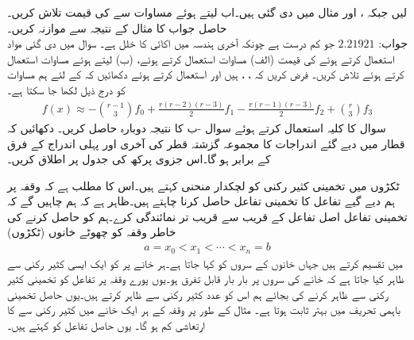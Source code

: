 \quad
{} لیں جبکہ ،  اور  مثال  میں دی گئی ہیں۔اب  لیتے ہوئے مساوات  سے  کی قیمت تلاش کریں۔حاصل جواب کا مثال  کے نتیجہ سے موازنہ کریں۔\\
جواب:\quad
$\num{2.21921}$
جو کم درست ہے چونکہ آخری ہندسہ میں  اکائی کا خلل ہے۔
\quad
سوال  میں دی گئی مواد استعمال کرتے ہوئے  کی قیمت  (الف) مساوات  استعمال کرتے ہوئے، (ب)  لیتے ہوئے مساوات  استعمال کرتے ہوئے تلاش کریں۔ 
\quad
فرض کریں کہ ، ،  ہیں اور  استعمال کرتے ہوئے دکھائیں کہ  کے لئے  ہم مساوات   کو درج ذیل لکھا جا سکتا ہے۔
\begin{align*}
f(x)\approx -\binom{r-1}{3}f_0+\frac{r(r-2)(r-3)}{2}f_1-\frac{r(r-1)(r-3)}{2}f_2+\binom{r}{3}f_3
\end{align*}
\quad
سوال  کا کلیہ استعمال کرتے ہوئے سوال -ب کا نتیجہ دوبارہ حاصل کریں۔  
\quad {}\quad
دکھائیں کہ قطار میں دیے گئے اندراجات کا مجموعہ گزشتہ قطر کی آخری اور پہلی اندراج کے فرق کے برابر ہو گا۔اس جزوی پرکھ کی  جدول  پر اطلاق کریں۔

ٹکڑوں میں تخمینی کثیر رکنی کو لچکدار منحنی کہتے ہیں۔اس کا مطلب ہے کہ وقفہ  پر ہم دیے گیے تفاعل  کا تخمینی تفاعل  حاصل کرنا چاہتے ہیں۔ظاہر ہے کہ ہم چاہیں گے کہ تخمینی تفاعل اصل تفاعل کے قریب سے قریب تر نمائندگی کرے۔ہم  کو حاصل کرنے کی خاطر وقفہ  کو چھوٹے خانوں (ٹکڑوں) 
\begin{align}\label{مساوات_اعدادی_لچکدار_منحنی_ٹکڑے_الف}
a=x_0<x_1<\cdots<x_n=b
\end{align}
 میں تقسیم کرتے ہیں جہاں خانوں کے  سروں  کو  کہا جاتا ہے۔ہر خانے  پر  کو ایک ایسی  کثیر رکنی  سے ظاہر کیا جاتا ہے  کہ خانے کی سروں پر  بار بار قابل تفرق ہو۔یوں پورے وقفہ  پر تفاعل  کو تخمینی کثیر رکنی سے ظاہر کرنے کی بجائے ہم اس کو  عدد کثیر رکنی سے ظاہر کرتے ہیں۔یوں حاصل تخمینی   باہمی تحریف میں بہتر ثابت ہوتا ہے۔ مثال کے طور پر وقفہ  کے ہر ایک خانے میں کثیر رکنی سے  کا  ارتعاشی کم ہو گا۔ یوں حاصل تفاعل  کو  کہتے ہیں۔


